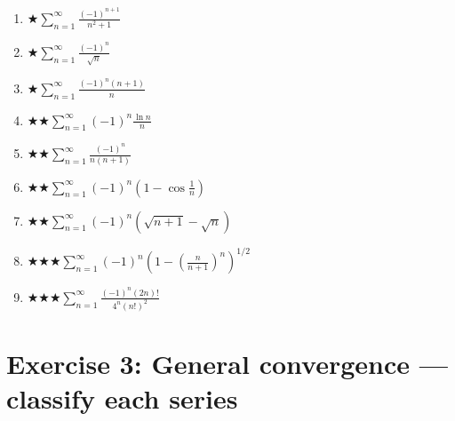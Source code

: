 \documentclass[12pt,a4paper]{article}
\newcommand{\easy}{{\color{green!60!black}$\bigstar$}}
\newcommand{\medium}{{\color{orange}$\bigstar\bigstar$}}
\newcommand{\hard}{{\color{red}$\bigstar\bigstar\bigstar$}}
\begin{document}
\begin{enumerate}[leftmargin=*, label=(\alph*)]

\item \easy\quad $\displaystyle\sum_{n=1}^{\infty}\frac{(-1)^{n+1}}{n^2+1}$

\item \easy\quad $\displaystyle\sum_{n=1}^{\infty}\frac{(-1)^n}{\sqrt{n}}$

\item \easy\quad $\displaystyle\sum_{n=1}^{\infty}\frac{(-1)^n(n+1)}{n}$

\item \medium\quad $\displaystyle\sum_{n=1}^{\infty}(-1)^n\frac{\ln n}{n}$

\item \medium\quad $\displaystyle\sum_{n=1}^{\infty}\frac{(-1)^n}{n(n+1)}$

\item \medium\quad $\displaystyle\sum_{n=1}^{\infty}(-1)^n\!\left(1-\cos\frac{1}{n}\right)$

\item \medium\quad $\displaystyle\sum_{n=1}^{\infty}(-1)^n\!\left(\sqrt{n+1}-\sqrt{n}\right)$

\item \hard\quad $\displaystyle\sum_{n=1}^{\infty}(-1)^n\!\left(1-\left(\frac{n}{n+1}\right)^n\right)^{1/2}$

\item \hard\quad $\displaystyle\sum_{n=1}^{\infty}\frac{(-1)^n(2n)!}{4^n(n!)^2}$

\end{enumerate}

\section*{Exercise 3: General convergence --- classify each series}
\end{document}
